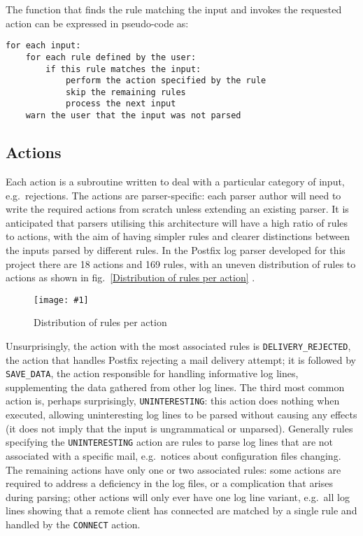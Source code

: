 \documentclass{svmult}
\newcommand{\showgraph}[3]{%
    \begin{figure}[btp]%
        \texttt{[image: \#1]}%
        \caption{#2}\label{#3}%
    \end{figure}%
}
\newcommand{\refwithlabel}[2]{%
    #1~\vref{#2}%
}
\newcommand{\graphref}[1]{%
    \refwithlabel{fig.}{#1}%
}
\newcommand{\numberOFrules}[0]{%
    169%
}
\newcommand{\numberOFactions}[0]{%
    18%
}
\begin{document}
The function that finds the rule matching the input and invokes the
requested action can be expressed in pseudo-code as:


\begin{verbatim}
for each input:
    for each rule defined by the user: 
        if this rule matches the input:
            perform the action specified by the rule
            skip the remaining rules
            process the next input
    warn the user that the input was not parsed
\end{verbatim}

\subsection{Actions}

\label{Actions}

Each action is a subroutine written to deal with a particular category of
input, e.g.\ rejections.  The actions are parser-specific: each parser
author will need to write the required actions from scratch unless
extending an existing parser.  It is anticipated that parsers utilising
this architecture will have a high ratio of rules to actions, with the aim
of having simpler rules and clearer distinctions between the inputs parsed
by different rules.  In the Postfix log parser developed for this project
there are \numberOFactions{} actions and \numberOFrules{} rules, with an
uneven distribution of rules to actions as shown in \graphref{Distribution
of rules per action}.
\showgraph{build/graph-action-distribution}{Distribution of rules per
action}{Distribution of rules per action} Unsurprisingly, the action with
the most associated rules is \texttt{DELIVERY\_REJECTED}, the action that
handles Postfix rejecting a mail delivery attempt; it is followed by
\texttt{SAVE\_DATA}, the action responsible for handling informative log
lines, supplementing the data gathered from other log lines.  The third
most common action is, perhaps surprisingly, \texttt{UNINTERESTING}: this
action does nothing when executed, allowing uninteresting log lines to be
parsed without causing any effects (it does not imply that the input is
ungrammatical or unparsed).  Generally rules specifying the
\texttt{UNINTERESTING} action are rules to parse log lines that are not
associated with a specific mail, e.g.\ notices about configuration files
changing.  The remaining actions have only one or two associated rules:
some actions are required to address a deficiency in the log files, or a
complication that arises during parsing;  other actions will only ever have
one log line variant, e.g.\ all log lines showing that a remote client has
connected are matched by a single rule and handled by the \texttt{CONNECT}
action.
\end{document}
